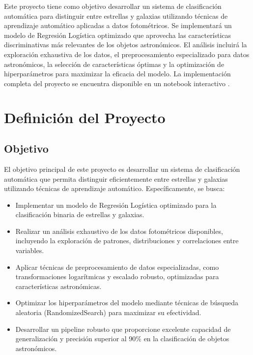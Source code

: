 \documentclass{article}
\begin{document}
Este proyecto tiene como objetivo desarrollar un sistema de clasificación automática para distinguir entre estrellas y galaxias utilizando técnicas de aprendizaje automático aplicadas a datos fotométricos. Se implementará un modelo de Regresión Logística optimizado que aprovecha las características discriminativas más relevantes de los objetos astronómicos. El análisis incluirá la exploración exhaustiva de los datos, el preprocesamiento especializado para datos astronómicos, la selección de características óptimas y la optimización de hiperparámetros para maximizar la eficacia del modelo. La implementación completa del proyecto se encuentra disponible en un notebook interactivo \cite{colab_notebook}.


\section{Definición del Proyecto}

\subsection{Objetivo}

El objetivo principal de este proyecto es desarrollar un sistema de clasificación automática que permita distinguir eficientemente entre estrellas y galaxias utilizando técnicas de aprendizaje automático. Específicamente, se busca:

\begin{itemize}
    \item Implementar un modelo de Regresión Logística optimizado para la clasificación binaria de estrellas y galaxias.
    \item Realizar un análisis exhaustivo de los datos fotométricos disponibles, incluyendo la exploración de patrones, distribuciones y correlaciones entre variables.
    \item Aplicar técnicas de preprocesamiento de datos especializadas, como transformaciones logarítmicas y escalado robusto, optimizadas para características astronómicas.
    \item Optimizar los hiperparámetros del modelo mediante técnicas de búsqueda aleatoria (RandomizedSearch) para maximizar su efectividad.
    \item Desarrollar un pipeline robusto que proporcione excelente capacidad de generalización y precisión superior al 90\% en la clasificación de objetos astronómicos.
\end{itemize}
\end{document}
